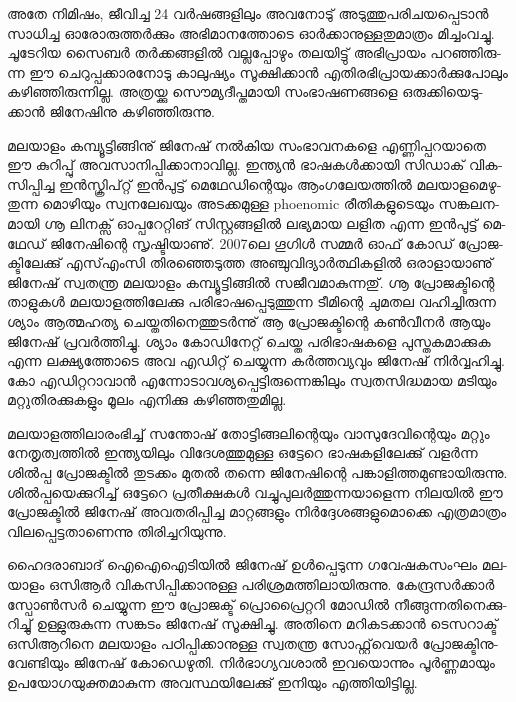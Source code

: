 അ­തേ നി­മി­ഷം, ജീ­വി­ച്ച 24 വര്‍­ഷ­ങ്ങ­ളി­ലും അവ­നോ­ടു് അടു­ത്തു­പ­രി­ച­യ­പ്പെ­ടാന്‍ സാ­ധി­ച്ച ഓരോ­രു­ത്തര്‍­ക്കും അഭി­മാ­ന­ത്തോ­ടെ 
ഓര്‍­ക്കാ­നു­ള്ള­തു­മാ­ത്രം മി­ച്ചം­വ­ച്ചു. ചൂ­ടേ­റിയ സൈ­ബര്‍ തര്‍­ക്ക­ങ്ങ­ളില്‍ വല്ല­പ്പോ­ഴും തല­യി­ട്ടു് അഭി­പ്രാ­യം പറ­ഞ്ഞി­രു­ന്ന ഈ 
ചെ­റു­പ്പ­ക്കാ­ര­നോ­ടു കാ­ലു­ഷ്യം സൂ­ക്ഷി­ക്കാന്‍ എതി­ര­ഭി­പ്രാ­യ­ക്കാര്‍­ക്കു­പോ­ലും കഴി­ഞ്ഞി­രു­ന്നി­ല്ല. അത്ര­യ്ക്കു സൌ­മ്യ­ദീ­പ്ത­മാ­യി 
സം­ഭാ­ഷ­ണ­ങ്ങ­ളെ ഒരു­ക്കി­യെ­ടു­ക്കാന്‍ ജി­നേ­ഷി­നു കഴി­ഞ്ഞി­രു­ന്നു­.

­മ­ല­യാ­ളം കമ്പ്യൂ­ട്ടി­ങ്ങി­നു് ജി­നേ­ഷ് നല്‍­കിയ സം­ഭാ­വ­ന­ക­ളെ എണ്ണി­പ്പ­റ­യാ­തെ ഈ കു­റി­പ്പു് അവ­സാ­നി­പ്പി­ക്കാ­നാ­വി­ല്ല. 
ഇന്ത്യന്‍ ഭാ­ഷ­കള്‍­ക്കാ­യി സി­ഡാ­ക്‍ വി­ക­സി­പ്പി­ച്ച ഇന്‍­സ്ക്രി­പ്റ്റ് ഇന്‍­പു­ട്ട് മെ­ഥേ­ഡി­ന്റെ­യും ആം­ഗ­ലേ­യ­ത്തില്‍ മല­യാ­ള­മെ­ഴു­തു­ന്ന 
മൊ­ഴി­യും സ്വ­ന­ലേ­ഖ­യും അട­ക്ക­മു­ള്ള phoenomic രീ­തി­ക­ളു­ടെ­യും സങ്ക­ല­ന­മാ­യി ഗ്നൂ ലി­ന­ക്സ് ഓപ്പ­റേ­റ്റി­ങ് സി­സ്റ്റ­ങ്ങ­ളില്‍ ലഭ്യ­മായ 
ലളിത എന്ന ഇന്‍­പു­ട്ട് മെ­ഥേ­ഡ് ജി­നേ­ഷി­ന്റെ സൃ­ഷ്ടി­യാ­ണു്. 2007­ലെ ഗൂ­ഗിള്‍ സമ്മര്‍ ഓഫ് കോ­ഡ് പ്രോ­ജ­ക്ടി­ലേ­ക്കു് എസ്എം­സി 
തി­ര­ഞ്ഞെ­ടു­ത്ത അഞ്ചു­വി­ദ്യാര്‍­ത്ഥി­ക­ളില്‍ ഒരാ­ളാ­യാ­ണു് ജി­നേ­ഷ് സ്വ­ത­ന്ത്ര മല­യാ­ളം കമ്പ്യൂ­ട്ടി­ങ്ങില്‍ സജീ­വ­മാ­കു­ന്ന­തു്. ഗ്നൂ 
പ്രോ­ജ­ക്ടി­ന്റെ താ­ളു­കള്‍ മല­യാ­ള­ത്തി­ലേ­ക്കു പരി­ഭാ­ഷ­പ്പെ­ടു­ത്തു­ന്ന ടീ­മി­ന്റെ ചു­മ­തല വഹി­ച്ചി­രു­ന്ന ശ്യാം ആത്മ­ഹ­ത്യ 
ചെ­യ്ത­തി­നെ­ത്തു­ടര്‍­ന്നു് ആ പ്രോ­ജ­ക്ടി­ന്റെ കണ്‍­വീ­നര്‍ ആയും ജി­നേ­ഷ് പ്ര­വര്‍­ത്തി­ച്ചു. ശ്യാം കോ­ഡി­നേ­റ്റ് ചെ­യ്ത പരി­ഭാ­ഷ­ക­ളെ 
പു­സ്ത­ക­മാ­ക്കുക എന്ന ലക്ഷ്യ­ത്തോ­ടെ അവ എഡി­റ്റ് ചെ­യ്യു­ന്ന കര്‍­ത്ത­വ്യ­വും ജി­നേ­ഷ് നിര്‍­വ്വ­ഹി­ച്ചു. കോ എഡി­റ്റ­റാ­വാന്‍ 
എന്നോ­ടാ­വ­ശ്യ­പ്പെ­ട്ടി­രു­ന്നെ­ങ്കി­ലും സ്വ­ത­സി­ദ്ധ­മായ മടി­യും മറ്റു­തി­ര­ക്കു­ക­ളും മൂ­ലം എനി­ക്കു കഴി­ഞ്ഞ­തു­മി­ല്ല.

­മ­ല­യാ­ള­ത്തി­ലാ­രം­ഭി­ച്ച് സന്തോ­ഷ് തോ­ട്ടി­ങ്ങ­ലി­ന്റെ­യും വാ­സു­ദേ­വി­ന്റെ­യും മറ്റും നേ­തൃ­ത്വ­ത്തില്‍ ഇന്ത്യ­യി­ലും വി­ദേ­ശ­ത്തു­മു­ള്ള ഒട്ടേ­റെ 
ഭാ­ഷ­ക­ളി­ലേ­ക്കു് വളര്‍­ന്ന ശില്‍പ്പ പ്രോ­ജ­ക്ടില്‍ തു­ട­ക്കം മു­തല്‍ തന്നെ ജി­നേ­ഷി­ന്റെ പങ്കാ­ളി­ത്ത­മു­ണ്ടാ­യി­രു­ന്നു. ശില്‍­പ്പ­യെ­ക്കു­റി­ച്ച് 
ഒട്ടേ­റെ പ്ര­തീ­ക്ഷ­കള്‍ വച്ചു­പു­ലര്‍­ത്തു­ന്ന­യാ­ളെ­ന്ന നി­ല­യില്‍ ഈ പ്രോ­ജ­ക്ടില്‍ ജി­നേ­ഷ് അവ­ത­രി­പ്പി­ച്ച മാ­റ്റ­ങ്ങ­ളും 
നിര്‍­ദ്ദേ­ശ­ങ്ങ­ളു­മൊ­ക്കെ എത്ര­മാ­ത്രം വി­ല­പ്പെ­ട്ട­താ­ണെ­ന്നു തി­രി­ച്ച­റി­യു­ന്നു­.

ഹൈ­ദ­രാ­ബാ­ദ് ഐഐ­ഐ­ടി­യില്‍ ജി­നേ­ഷ് ഉള്‍­പ്പെ­ടു­ന്ന ഗവേ­ഷ­ക­സം­ഘം മല­യാ­ളം ഒ­സി­ആര്‍ വി­ക­സി­പ്പി­ക്കാ­നു­ള്ള 
പരി­ശ്ര­മ­ത്തി­ലാ­യി­രു­ന്നു. കേ­ന്ദ്ര­സര്‍­ക്കാര്‍ സ്പോണ്‍­സര്‍ ചെ­യ്യു­ന്ന ഈ പ്രോ­ജ­ക്ട് പ്രൊ­പ്രൈ­റ്റ­റി മോ­ഡില്‍ നീ­ങ്ങു­ന്ന­തി­നെ­ക്കു­റി­ച്ചു് 
ഉള്ളു­രു­കു­ന്ന സങ്ക­ടം ജി­നേ­ഷ് സൂ­ക്ഷി­ച്ചു. അതി­നെ മറി­ക­ട­ക്കാന്‍ ടെ­സ­റാ­ക്ട് ഒസി­ആ­റി­നെ മല­യാ­ളം പഠി­പ്പി­ക്കാ­നു­ള്ള സ്വ­ത­ന്ത്ര 
സോ­ഫ്റ്റ്‌­വെ­യര്‍ പ്രോ­ജ­ക്ടി­നു­വേ­ണ്ടി­യും ജി­നേ­ഷ് കോ­ഡെ­ഴു­തി. നിര്‍­ഭാ­ഗ്യ­വ­ശാല്‍ ഇവ­യൊ­ന്നും പൂര്‍­ണ്ണ­മാ­യും 
ഉപ­യോ­ഗ­യു­ക്ത­മാ­കു­ന്ന അവ­സ്ഥ­യി­ലേ­ക്കു് ഇനി­യും എത്തി­യി­ട്ടി­ല്ല.

